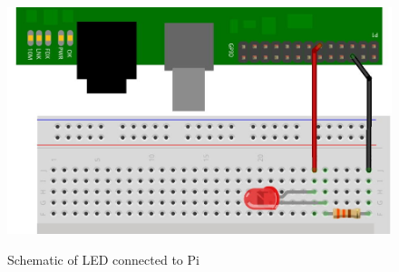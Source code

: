 \documentclass[journal,12pt,twocolumn]{IEEEtran}
\begin{document}
\begin{figure}[h!]
\centering
\includegraphics[scale=0.9]{figs/blink}
\caption{Schematic of LED connected to Pi}\cite{b1}
\end{figure}
\end{document}
